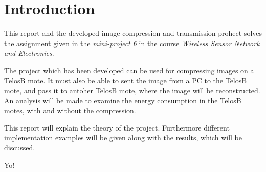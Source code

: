 \chapter{Introduction}
\label{chp:intro}

This report and the developed image compression and transmission prohect solves the assignment given in the \emph{mini-project 6} in the course \emph{Wireless Sensor Network and Electronics}.

The project which has been developed can be used for compressing images on a TelosB mote. It must also be able to sent the image from a PC to the TelosB mote, and pass it to antoher TelosB mote, where the image will be reconstructed. An analysis will be made to examine the energy consumption in the TelosB motes, with and without the compression.

This report will explain the theory of the project. Furthermore different implementation examples will be given along with the results, which will be discussed.

Yo!